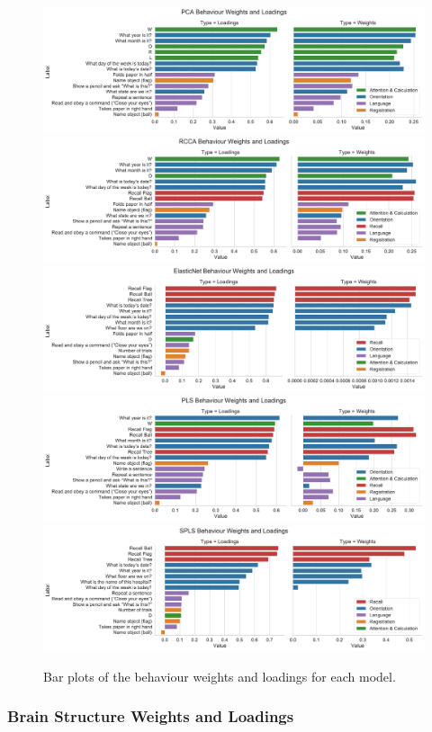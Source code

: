 \begin{figure}
\centering
\includegraphics[width=0.8\linewidth]{figures/adni/PCA behaviour weights and loadings}
\includegraphics[width=0.8\linewidth]{figures/adni/RCCA behaviour weights and loadings}
\includegraphics[width=0.8\linewidth]{figures/adni/ElasticNet behaviour weights and loadings}
\includegraphics[width=0.8\linewidth]{figures/adni/PLS behaviour weights and loadings}
\includegraphics[width=0.8\linewidth]{figures/adni/SPLS behaviour weights and loadings}
\caption{Bar plots of the behaviour \gls{weights} and \gls{loadings} for each model.}
\end{figure}

\subsubsection{Brain Structure Weights and Loadings}

